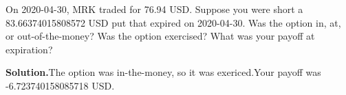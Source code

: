 \noindent On 2020-04-30, MRK traded for 76.94 USD. Suppose you were short a 83.66374015808572 USD put that expired on 2020-04-30. Was the option in, at, or out-of-the-money? Was the option exercised? What was your payoff at expiration?

\vspace{9pt} 

\textbf{Solution.}The option was in-the-money, so it was exericed.Your payoff was -6.723740158085718 USD.